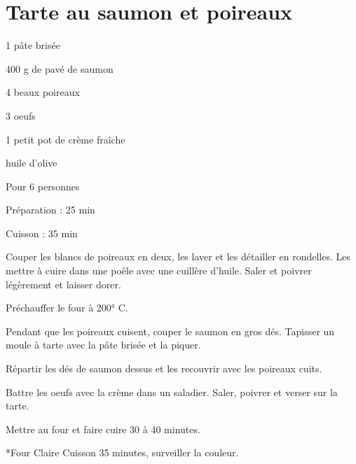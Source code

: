 \section[\normalsize{Tarte au saumon et poireaux}]{Tarte au saumon et poireaux}

\begin{ingredients}
\item 1 p\^ate bris\'ee
\item 400 g de pav\'e de saumon
\item 4 beaux poireaux
\item 3 oeufs
\item 1 petit pot de cr\`eme fra\^iche
\item huile d'olive
\end{ingredients}
\begin{infos}
\item Pour 6 personnes
\item Préparation : 25 min
\item Cuisson : 35 min
\end{infos}
\begin{etapes}
\item Couper les blancs de poireaux en deux, les laver et les d\'etailler en rondelles. Les mettre \`a cuire dans une po\^ele avec une cuill\`ere d'huile. Saler et poivrer l\'eg\`erement et laisser dorer.
\item Pr\'echauffer le four \`a 200° C.
\item Pendant que les poireaux cuisent, couper le saumon en gros d\'es. Tapisser un moule \`a tarte avec la p\^ate bris\'ee et la piquer. 
\item R\'epartir les d\'es de saumon dessus et les recouvrir avec les poireaux cuits.
\item Battre les oeufs avec la cr\`eme dans un saladier. Saler, poivrer et verser sur la tarte.
\item Mettre au four et faire cuire 30 \`a 40 minutes.
\end{etapes}
\begin{conseils}
*Four Claire Cuisson 35 minutes, surveiller la couleur.
\end{conseils}


